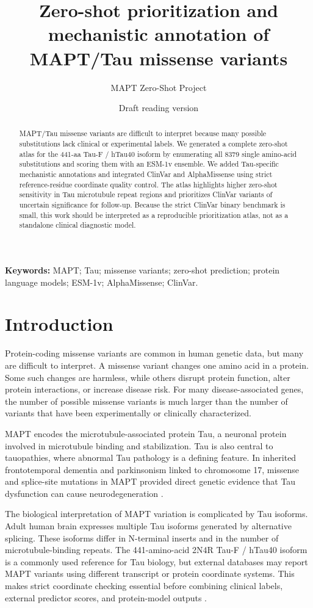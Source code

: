 \documentclass[11pt]{article}
\title{Zero-shot prioritization and mechanistic annotation of MAPT/Tau missense variants}
\author{MAPT Zero-Shot Project}
\date{Draft reading version}
\begin{document}
\maketitle

\begin{abstract}
MAPT/Tau missense variants are difficult to interpret because many possible
substitutions lack clinical or experimental labels. We generated a complete
zero-shot atlas for the 441-aa Tau-F / hTau40 isoform by enumerating all 8379
single amino-acid substitutions and scoring them with an ESM-1v ensemble. We
added Tau-specific mechanistic annotations and integrated ClinVar and
AlphaMissense using strict reference-residue coordinate quality control. The
atlas highlights higher zero-shot sensitivity in Tau microtubule repeat regions
and prioritizes ClinVar variants of uncertain significance for follow-up. Because
the strict ClinVar binary benchmark is small, this work should be interpreted as
a reproducible prioritization atlas, not as a standalone clinical diagnostic
model.
\end{abstract}

\noindent\textbf{Keywords:} MAPT; Tau; missense variants; zero-shot prediction;
protein language models; ESM-1v; AlphaMissense; ClinVar.

\section{Introduction}

Protein-coding missense variants are common in human genetic data, but many are
difficult to interpret. A missense variant changes one amino acid in a protein.
Some such changes are harmless, while others disrupt protein function, alter
protein interactions, or increase disease risk. For many disease-associated
genes, the number of possible missense variants is much larger than the number of
variants that have been experimentally or clinically characterized.

MAPT encodes the microtubule-associated protein Tau, a neuronal protein involved
in microtubule binding and stabilization. Tau is also central to tauopathies,
where abnormal Tau pathology is a defining feature. In inherited frontotemporal
dementia and parkinsonism linked to chromosome 17, missense and splice-site
mutations in MAPT provided direct genetic evidence that Tau dysfunction can cause
neurodegeneration \citep{hutton1998tau,spillantini2000tau}.

The biological interpretation of MAPT variation is complicated by Tau isoforms.
Adult human brain expresses multiple Tau isoforms generated by alternative
splicing. These isoforms differ in N-terminal inserts and in the number of
microtubule-binding repeats. The 441-amino-acid 2N4R Tau-F / hTau40 isoform is a
commonly used reference for Tau biology, but external databases may report MAPT
variants using different transcript or protein coordinate systems. This makes
strict coordinate checking essential before combining clinical labels, external
predictor scores, and protein-model outputs \citep{spillantini2000tau}.
\end{document}
